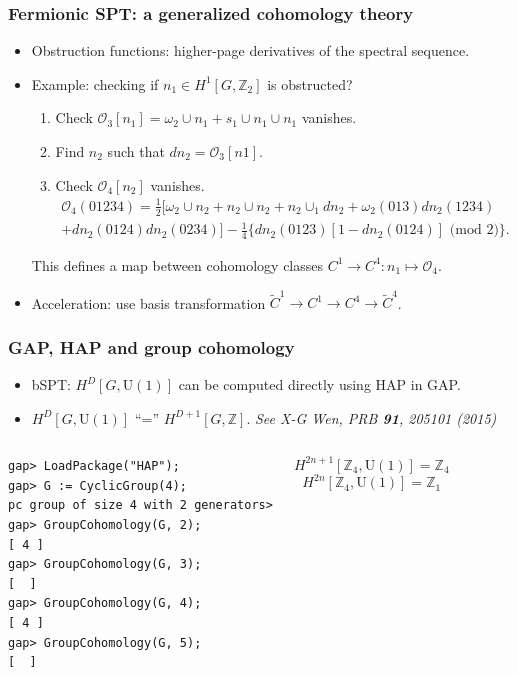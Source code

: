 \documentclass[xcolor=table, 11pt, aspectratio=1610]{beamer}
\newcommand{\uone}{\mathrm U(1)}
\begin{document}
\begin{frame}
	\frametitle{Fermionic SPT: a generalized cohomology theory}
	\begin{itemize}
		\item Obstruction functions: higher-page derivatives of the spectral sequence.
		\item Example: checking if $n_1\in H^1[G, \mathbb Z_2]$ is obstructed?
		\begin{enumerate}
			\item Check $\mathcal O_3[n_1] = \omega_2\cup n_1 + s_1\cup n_1\cup n_1$ vanishes.
			\item Find $n_2$ such that $dn_2 = \mathcal O_3[n1]$.
			\item Check $\mathcal O_4[n_2]$ vanishes.
			\begin{align*}\mathcal O_4(01234) = \frac12\big[\omega_2\cup n_2 + n_2\cup n_2 + n_2 \cup_1 dn_2 + \omega_2(013)dn_2(1234)\\ + dn_2(0124)dn_2(0234)\big]
			-\frac14\big\{dn_2(0123)[1-dn_2(0124)]\text{ (mod 2)}\big\}.
		\end{align*}
		\end{enumerate}
		This defines a map between cohomology classes
		$C^1\rightarrow C^4:n_1\mapsto \mathcal O_4$.
		\item Acceleration: use basis transformation $\tilde C^1\rightarrow C^1\rightarrow C^4\rightarrow\tilde C^4$.
	\end{itemize}
\end{frame}

\begin{frame}[fragile]
	\frametitle{GAP, HAP and group cohomology}
	\begin{itemize}
		\item bSPT: $H^D[G,\uone]$ can be computed directly using HAP in GAP.
		\item $H^D[G,\uone]$ ``='' $H^{D+1}[G,\mathbb Z]$. \emph{See X-G Wen, PRB \textbf{91}, 205101 (2015)}
	\end{itemize}
	\begin{columns}
	\begin{lstlisting}[basicstyle=\footnotesize]
gap> LoadPackage("HAP");
gap> G := CyclicGroup(4);
pc group of size 4 with 2 generators>
gap> GroupCohomology(G, 2);
[ 4 ]
gap> GroupCohomology(G, 3);
[  ]
gap> GroupCohomology(G, 4);
[ 4 ]
gap> GroupCohomology(G, 5);
[  ]
\end{lstlisting}
	\[H^{2n+1}[\mathbb Z_4,\uone] = \mathbb Z_4\]
	\[H^{2n}[\mathbb Z_4,\uone] = \mathbb Z_1\]
	\end{columns}
\end{frame}
\end{document}

